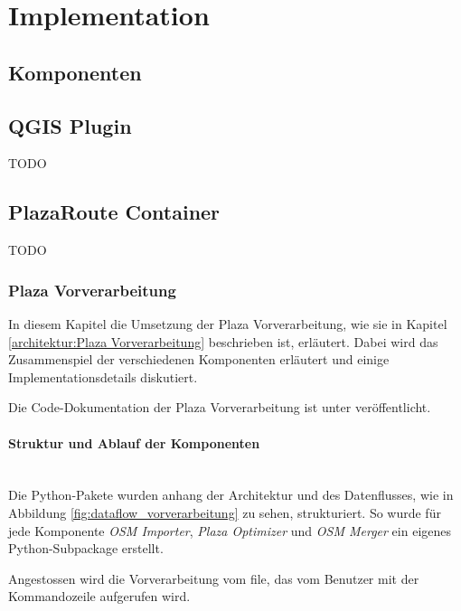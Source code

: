 
\section{Implementation}
\label{sec:Implementation}

\subsection{Komponenten}
\label{impl:Komponenten}

\subsection{QGIS Plugin}
\label{impl:QGIS Plugin}
TODO

\subsection{PlazaRoute Container}
\label{impl:PlazaRoute Container}
TODO

\subsubsection{Plaza Vorverarbeitung}
\label{impl:Plaza Vorverarbeitung}

In diesem Kapitel die Umsetzung der Plaza Vorverarbeitung, wie sie in Kapitel \ref{architektur:Plaza Vorverarbeitung} beschrieben ist, erläutert. Dabei wird das Zusammenspiel der verschiedenen Komponenten erläutert und einige Implementationsdetails diskutiert.

Die Code-Dokumentation der Plaza Vorverarbeitung ist unter \cite{PlazaRoute-apidoc} veröffentlicht.

\paragraph{Struktur und Ablauf der Komponenten} \label{impl:Struktur der Komponenten} ~\\
Die Python-Pakete wurden anhang der Architektur und des Datenflusses, wie in Abbildung \ref{fig:dataflow_vorverarbeitung} zu sehen, strukturiert. So wurde für jede Komponente \emph{OSM Importer}, \emph{Plaza Optimizer} und \emph{OSM Merger} ein eigenes Python-Subpackage erstellt.

Angestossen wird die Vorverarbeitung vom  file, das vom Benutzer mit der Kommandozeile aufgerufen wird.

